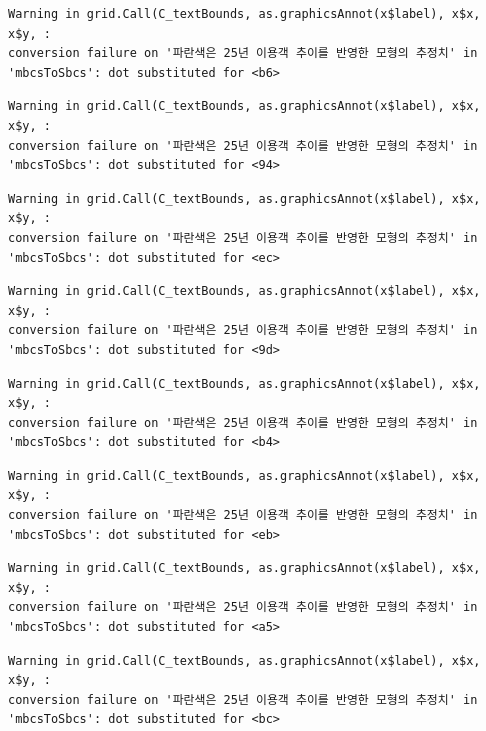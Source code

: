 \documentclass[
  letterpaper,
  DIV=11,
  numbers=noendperiod]{scrreprt}
\begin{document}
\begin{verbatim}
Warning in grid.Call(C_textBounds, as.graphicsAnnot(x$label), x$x, x$y, :
conversion failure on '파란색은 25년 이용객 추이를 반영한 모형의 추정치' in
'mbcsToSbcs': dot substituted for <b6>
\end{verbatim}

\begin{verbatim}
Warning in grid.Call(C_textBounds, as.graphicsAnnot(x$label), x$x, x$y, :
conversion failure on '파란색은 25년 이용객 추이를 반영한 모형의 추정치' in
'mbcsToSbcs': dot substituted for <94>
\end{verbatim}

\begin{verbatim}
Warning in grid.Call(C_textBounds, as.graphicsAnnot(x$label), x$x, x$y, :
conversion failure on '파란색은 25년 이용객 추이를 반영한 모형의 추정치' in
'mbcsToSbcs': dot substituted for <ec>
\end{verbatim}

\begin{verbatim}
Warning in grid.Call(C_textBounds, as.graphicsAnnot(x$label), x$x, x$y, :
conversion failure on '파란색은 25년 이용객 추이를 반영한 모형의 추정치' in
'mbcsToSbcs': dot substituted for <9d>
\end{verbatim}

\begin{verbatim}
Warning in grid.Call(C_textBounds, as.graphicsAnnot(x$label), x$x, x$y, :
conversion failure on '파란색은 25년 이용객 추이를 반영한 모형의 추정치' in
'mbcsToSbcs': dot substituted for <b4>
\end{verbatim}

\begin{verbatim}
Warning in grid.Call(C_textBounds, as.graphicsAnnot(x$label), x$x, x$y, :
conversion failure on '파란색은 25년 이용객 추이를 반영한 모형의 추정치' in
'mbcsToSbcs': dot substituted for <eb>
\end{verbatim}

\begin{verbatim}
Warning in grid.Call(C_textBounds, as.graphicsAnnot(x$label), x$x, x$y, :
conversion failure on '파란색은 25년 이용객 추이를 반영한 모형의 추정치' in
'mbcsToSbcs': dot substituted for <a5>
\end{verbatim}

\begin{verbatim}
Warning in grid.Call(C_textBounds, as.graphicsAnnot(x$label), x$x, x$y, :
conversion failure on '파란색은 25년 이용객 추이를 반영한 모형의 추정치' in
'mbcsToSbcs': dot substituted for <bc>
\end{verbatim}
\end{document}
